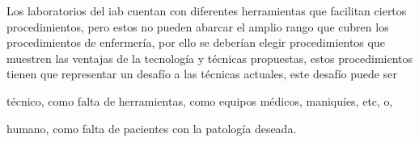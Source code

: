 \begin{itemize}
    Los laboratorios del \Gls{iab} cuentan con diferentes herramientas que
    facilitan ciertos procedimientos, pero estos no pueden abarcar el amplio
    rango que cubren los procedimientos de enfermería, por ello se deberían
    elegir procedimientos que muestren las ventajas de la tecnología y técnicas
    propuestas, estos procedimientos tienen que representar un desafío a las
    técnicas actuales, este desafío puede ser 
    \begin{enumerate*}[label=\itshape\alph*\upshape.]
    \item técnico, como falta de herramientas, como equipos médicos, maniquíes,
        etc, o,
    \item humano, como falta de pacientes con la patología deseada.
    \end{enumerate*}
    
\end{itemize}
